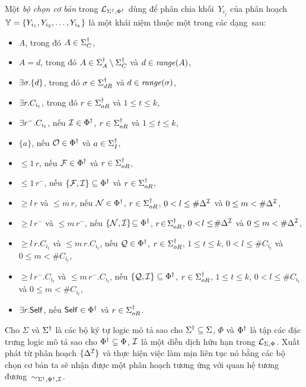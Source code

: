 \begin{Definition}
	\label{def:BasicSelectors}
	Một {\em bộ chọn cơ bản} trong $\mathcal{L}_{\Sigma^\dag,\Phi^\dag}$ dùng để phân chia khối~$Y_{i_j}$ của phân hoạch $\mathbb{Y} = \{Y_{i_1}, Y_{i_2}, \ldots, Y_{i_k}\}$ là một khái niệm thuộc một trong các dạng~sau:
	\begin{itemize}
		\item $A$, trong đó $A \in \Sigma^\dag_C$,
%		
		\item $A=d$, trong đó $A \in \Sigma^\dag_A\setminus\Sigma^\dag_C$ và $d \in \mathit{range}(A)$,
%		
		\item $\exists \sigma.\{d\}$, trong đó $\sigma \in \Sigma^\dag_{dR}$ và $d \in \mathit{range}(\sigma)$,
%
		\item $\exists r.C_{i_t}$, trong đó $r \in \Sigma^\dag_{oR}$ và $1 \leq t \leq k$,
%		
		\item $\exists r^-.C_{i_t}$, nếu $\mathcal{I} \in \Phi^\dag$, $r \in \Sigma^\dag_{oR}$ và $1 \leq t \leq k$,
%
		\item $\{a\}$, nếu $\mathcal{O} \in \Phi^\dag$ và $a \in \Sigma^\dag_I$,
%		
		\item $\leq\!1\,r$, nếu $\mathcal{F} \in \Phi^\dag$ và $r \in \Sigma^\dag_{oR}$,
%		
		\item $\leq\!1\,r^-$, nếu $\{\mathcal{F}, \mathcal{I}\} \subseteq \Phi^\dag$ và $r \in \Sigma^\dag_{oR}$,
%
		\item $\geq\!l\,r$ và $\leq\!m\,r$, nếu $\mathcal{N} \in \Phi^\dag$, $r \in \Sigma^\dag_{oR}$, $0 < l \leq \#\Delta^{\mathcal{I}}$ và $0 \leq m < \#\Delta^{\mathcal{I}}$,
%
		\item $\geq\!l\,r^-$ và $\leq\!m\,r^-$, nếu $\{\mathcal{N}, \mathcal{I}\}\!\subseteq \Phi^\dag$, $r\!\in\!\Sigma^\dag_{oR}$, $0 <\!l \leq\! \#\Delta^{\mathcal{I}}$ và $0 \leq m < \#\Delta^{\mathcal{I}}$,
%
		\item $\geq\!l\,r.C_{i_t}$ và $\leq\!m\,r.C_{i_t}$, nếu $\mathcal{Q} \in \Phi^\dag$, $r \in \Sigma^\dag_{oR}$, $1 \leq t \leq k$, $0 < l \leq \#C_{i_t}$ và $0 \leq m < \#C_{i_t}$,
%
		\item $\geq\!l\,r^-.C_{i_t}$ và $\leq\!m\,r^-.C_{i_t}$, nếu $\{\mathcal{Q}, \mathcal{I}\} \subseteq \Phi^\dag$, $r \in \Sigma^\dag_{oR}$, $1 \leq t \leq k$, $0 < l \leq \#C_{i_t}$ và $0 \leq m < \#C_{i_t}$,
%
		\item $\exists r.\mathsf{Self}$, nếu $\mathsf{Self} \in \Phi^\dag$ và $r \in \Sigma^\dag_{oR}$.\myend
	\end{itemize}
\end{Definition}

\begin{Theorem}
\label{th:BasicSelectors}
	Cho $\Sigma$ và $\Sigma^\dag$ là các bộ ký tự logic mô tả sao cho $\Sigma^\dag \subseteq \Sigma$, $\Phi$ và $\Phi^\dag$ là tập các đặc trưng logic mô tả sao cho $\Phi^\dag \subseteq \Phi$, $\mathcal{I}$ là một diễn dịch hữu hạn trong $\mathcal{L}_{\Sigma,\Phi}$.
	Xuất phát từ phân hoạch $\{\Delta^{\mathcal{I}}\}$ và thực hiện việc làm mịn liên tục nó bằng các bộ chọn cơ bản ta sẽ nhận được một phân hoạch tương ứng với quan hệ tương đương~$\sim_{\Sigma^\dag,\Phi^\dag,\mathcal{I}}$.\myend
\end{Theorem}

